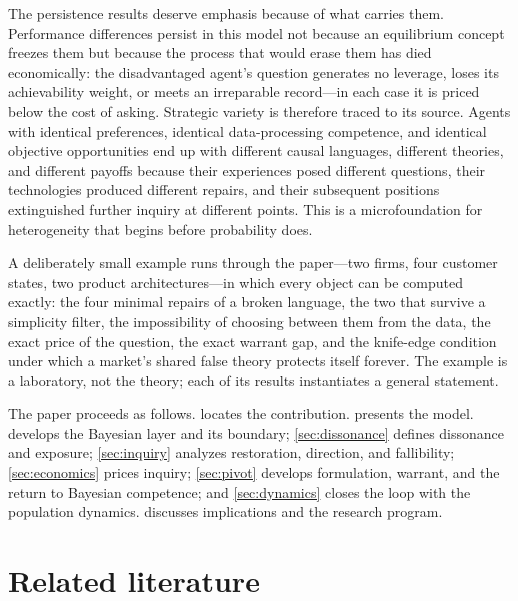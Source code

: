 \documentclass[11pt]{article}
\theoremstyle{definition}
\begin{document}
The persistence results deserve emphasis because of what carries them.
Performance differences persist in this model not because an equilibrium
concept freezes them but because the process that would erase them has died
economically: the disadvantaged agent's question generates no leverage, loses
its achievability weight, or meets an irreparable record---in each case it is
priced below the cost of asking.
Strategic variety is therefore traced to its source.  Agents with identical
preferences, identical data-processing competence, and identical objective
opportunities end up with different causal languages, different theories, and
different payoffs because their experiences posed different questions, their
technologies produced different repairs, and their subsequent positions
extinguished further inquiry at different points.  This is a microfoundation
for heterogeneity that begins before probability does.

A deliberately small example runs through the paper---two firms, four
customer states, two product architectures---in which every object can be
computed exactly: the four minimal repairs of a broken language, the two that
survive a simplicity filter, the impossibility of choosing between them from
the data, the exact price of the question, the exact warrant gap, and the
knife-edge condition under which a market's shared false theory protects
itself forever.  The example is a laboratory, not the theory; each of its
results instantiates a general statement.

The paper proceeds as follows.   locates the
contribution.   presents the model.
 develops the Bayesian layer and its boundary;
\cref{sec:dissonance} defines dissonance and exposure;
\cref{sec:inquiry} analyzes restoration, direction, and fallibility;
\cref{sec:economics} prices inquiry; \cref{sec:pivot} develops formulation,
warrant, and the return to Bayesian competence; and \cref{sec:dynamics}
closes the loop with the population dynamics.  
discusses implications and the research program.
\section{Related literature}
\label{sec:literature}
\end{document}
